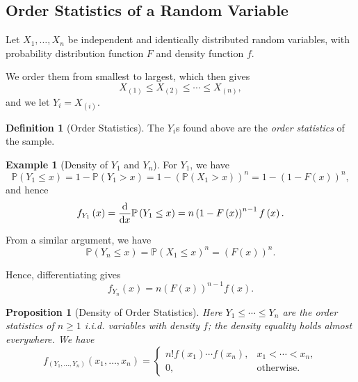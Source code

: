 \documentclass[11pt]{article}
\numberwithin{equation}{section}
\newtheorem{proposition}[theorem]{Proposition}
\theoremstyle{definition}
\newtheorem{definition}[theorem]{Definition}
\newtheorem{example}[theorem]{Example}
\theoremstyle{remark}
\newcommand{\pqty}[1]{\left(#1\right)}
\newcommand{\Prob}{\mathbb P}
\begin{document}
\subsection{Order Statistics of a Random Variable}

Let \(X_1, \ldots, X_n\) be independent and identically distributed random variables, with probability distribution function \(F\) and density function \(f\).

We order them from smallest to largest, which then gives
\[
    X_{\pqty{1}} \leq X_{\pqty{2}} \leq \cdots \leq X_{\pqty{n}},
\]
and we let \(Y_i = X_{\pqty{i}}\).

\begin{definition}[Order Statistics]\label{probability-definition-057}
    \label{probability-def:order-statistics}%
    The \(Y_i\)s found above are the \emph{order statistics} of the sample.
\end{definition}

\begin{example}[Density of \(Y_1\) and \(Y_n\)]\label{probability-example-038}
    \label{probability-ex:density-y1-yn}%
    For \(Y_1\), we have
    \[
        \Prob\pqty{Y_1 \leq x} = 1 - \Prob\pqty{Y_1 > x} = 1 - \pqty{\Prob\pqty{X_1 > x}}^n = 1 - \pqty{1 - F\pqty{x}}^n,
    \]
    and hence
    \[
        f_{Y_1} \pqty{x} = \dv{x} \Prob\pqty{Y_1 \leq x} = n \pqty{1 - F\pqty{x}}^{n - 1} f\pqty{x}.
    \]

    From a similar argument, we have
    \[
        \Prob\pqty{Y_n \leq x} = \Prob\pqty{X_1 \leq x}^n = \pqty{F\pqty{x}}^n.
    \]

    Hence, differentiating gives
    \[
        f_{Y_n} \pqty{x} = n \pqty{F\pqty{x}}^{n - 1} f\pqty{x}.
\]
\end{example}

\begin{proposition}[Density of Order Statistics]\label{probability-proposition-039}
    \label{probability-prop:density-order-stats}
Here \(Y_1\le\cdots\le Y_n\) are the order statistics of \(n\ge1\) i.i.d. variables with density \(f\); the density equality holds almost everywhere.
%
    We have
    \[
        f_{\pqty{Y_1, \ldots, Y_n}} \pqty{x_1, \ldots, x_n} = \begin{cases}
            n! f\pqty{x_1} \cdots f\pqty{x_n}, & x_1 < \cdots < x_n, \\
            0, & \text{otherwise}.
        \end{cases}
    \]
\end{proposition}
\end{document}
